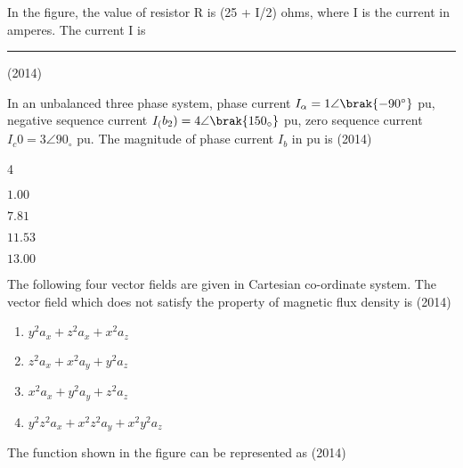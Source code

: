 \iffalse
\chapter{2014}
\author{AI24BTECH11004-Bheri Sai Likith Reddy}
\section{ee}
\fi

       \item In the figure, the value of resistor R is (25 + I/2) ohms, where I is the current in amperes. The
       current I is  \rule{1cm}{0.15mm}
       \hfill{(2014)}
		

	\item In an unbalanced three phase system, phase current $I_\alpha=1\angle \brak{-90^{\circ}}$ pu, negative sequence current $I_(b_2)=4\angle \brak{150_{\circ}}$ pu, zero sequence current $I_c0=3 \angle 90_{\circ}$ pu. The magnitude of phase current $I_b$ in pu is
	\hfill{(2014)}

               \begin{enumerate}
	       \end{enumerate}	
       \item The following four vector fields are given in Cartesian co-ordinate system. The vector field which
does not satisfy the property of magnetic flux density is
\hfill{(2014)}
		\begin{enumerate}
			\item $y^2a_x+z^2a_x+x^2a_z$
			\item $z^2a_x+x^2a_y+y^2a_z$
			\item $x^2a_x+y^2a_y+z^2a_z$
			\item $y^2z^2a_x+x^2z^2a_y+x^2y^2a_z$
		\end{enumerate}
	\item  The function shown in the figure can be represented as
	\hfill{(2014)}
		



